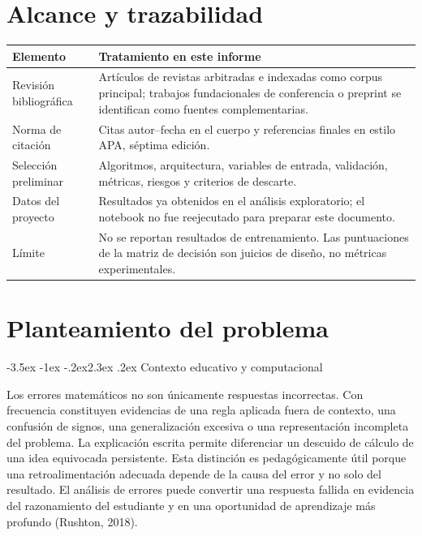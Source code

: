 \documentclass[11pt,oneside,openany]{book}
\makeatletter
\renewcommand\section{\@startsection{section}{1}{\z@}%
  {-3.5ex \@plus -1ex \@minus -.2ex}{2.3ex \@plus .2ex}%
  {\normalfont\Large\sffamily\bfseries\color{AzulMedio}}}
\makeatother
\begin{document}
\chapter*{Alcance y trazabilidad}

\begin{tabularx}{\textwidth}{@{}P{3.3cm}Y@{}}
\toprule
\textbf{Elemento} & \textbf{Tratamiento en este informe}\\
\midrule
Revisión bibliográfica & Artículos de revistas arbitradas e indexadas como corpus
principal; trabajos fundacionales de conferencia o preprint se identifican como
fuentes complementarias.\\
Norma de citación & Citas autor--fecha en el cuerpo y referencias finales en estilo
APA, séptima edición.\\
Selección preliminar & Algoritmos, arquitectura, variables de entrada, validación,
métricas, riesgos y criterios de descarte.\\
Datos del proyecto & Resultados ya obtenidos en el análisis exploratorio; el
notebook no fue reejecutado para preparar este documento.\\
Límite & No se reportan resultados de entrenamiento. Las puntuaciones de la matriz
de decisión son juicios de diseño, no métricas experimentales.\\
\bottomrule
\end{tabularx}

\tableofcontents
\listoftables
\listoffigures

\mainmatter

\chapter{Planteamiento del problema}

\section{Contexto educativo y computacional}

Los errores matemáticos no son únicamente respuestas incorrectas. Con frecuencia
constituyen evidencias de una regla aplicada fuera de contexto, una confusión de
signos, una generalización excesiva o una representación incompleta del problema.
La explicación escrita permite diferenciar un descuido de cálculo de una idea
equivocada persistente. Esta distinción es pedagógicamente útil porque una
retroalimentación adecuada depende de la causa del error y no solo del resultado.
El análisis de errores puede convertir una respuesta fallida en evidencia del
razonamiento del estudiante y en una oportunidad de aprendizaje más profundo
(Rushton, 2018).
\end{document}
